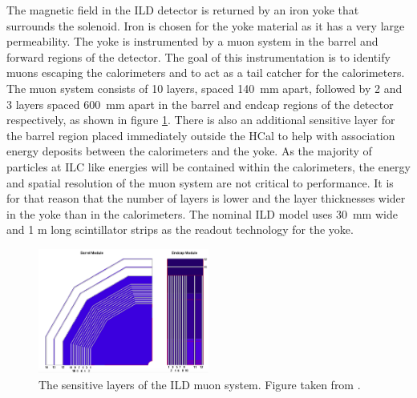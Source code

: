 The magnetic field in the ILD detector is returned by an iron yoke that surrounds the solenoid.  Iron is chosen for the yoke material as it has a very large permeability.  The yoke is instrumented by a muon system in the barrel and forward regions of the detector.  The goal of this instrumentation is to identify muons escaping the calorimeters and to act as a tail catcher for the calorimeters.  The muon system consists of 10 layers, spaced 140~mm apart, followed by 2 and 3 layers spaced 600~mm apart in the barrel and endcap regions of the detector respectively, as shown in figure \ref{fig:muon}.  There is also an additional sensitive layer for the barrel region placed immediately outside the HCal to help with association energy deposits between the calorimeters and the yoke.  As the majority of particles at ILC like energies will be contained within the calorimeters, the energy and spatial resolution of the muon system are not critical to performance.  It is for that reason that the number of layers is lower and the layer thicknesses wider in the yoke than in the calorimeters.  The nominal ILD model uses 30~mm wide and 1 m long scintillator strips as the readout technology for the yoke.

\begin{figure}[h!]
\centering
\includegraphics[width=0.5\textwidth]{LCDetectorsAndPFlow/Plots/Pictures/Muon.png}
\caption[The sensitive layers of the ILD muon system.  Figure taken from  \cite{Behnke:2013lya}.]{The sensitive layers of the ILD muon system.  Figure taken from  \cite{Behnke:2013lya}.}
\label{fig:muon}
\end{figure}   


